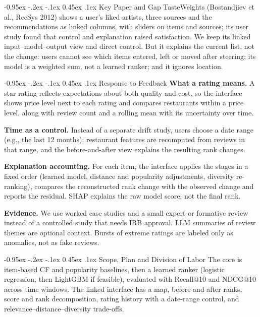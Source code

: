 \documentclass[10pt]{article}
\makeatletter
\renewcommand\section{\@startsection{section}{1}{\z@}%
  {-0.95ex \@plus -.2ex \@minus -.1ex}%
  {0.45ex \@plus .1ex}%
  {\normalfont\large\bfseries}}
\makeatother
\begin{document}
\section{Key Paper and Gap}
TasteWeights (Bostandjiev et al., RecSys 2012) shows a user's liked artists, three sources and the recommendations as
linked columns, with sliders on items and sources; its user study found that control and explanation raised satisfaction. We keep its linked input--model--output view and direct control. But it explains the current list, not the
change: users cannot see which items entered, left or moved after steering; its model is a weighted sum, not a
learned ranker; and it ignores location.

\section{Response to Feedback}
\textbf{What a rating means.} A star rating reflects expectations about both quality and cost, so the interface shows
price level next to each rating and compares restaurants within a price level, along with review count and a
rolling mean with its uncertainty over time.

\textbf{Time as a control.} Instead of a separate drift study, users choose a date range (e.g., the last 12
months); restaurant features are recomputed from reviews in that range, and the before-and-after view explains the
resulting rank changes.

\textbf{Explanation accounting.} For each item, the interface applies the stages in a fixed order (learned model,
distance and popularity adjustments, diversity re-ranking), compares the reconstructed rank change with the observed
change and reports the residual. SHAP explains the raw model score, not the final rank.

\textbf{Evidence.} We use worked case studies and a small expert or formative review instead of a controlled study that needs
IRB approval. LLM summaries of review themes are optional context. Bursts of extreme ratings are labeled
only as anomalies, not as fake reviews.

\section{Scope, Plan and Division of Labor}
The core is item-based CF and popularity baselines, then a learned ranker (logistic regression, then LightGBM if
feasible), evaluated with Recall@10 and NDCG@10 across time windows. The linked interface has a map, before-and-after
ranks, score and rank decomposition, rating history with a date-range control, and relevance--distance--diversity
trade-offs.
\end{document}
